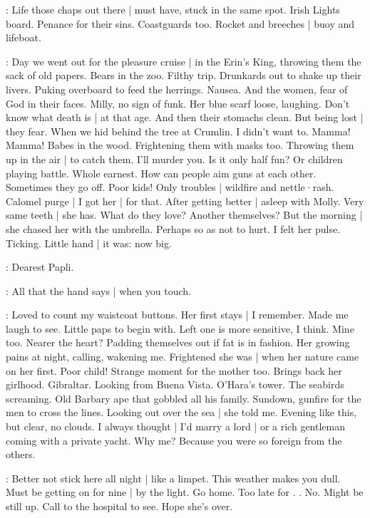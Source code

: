 \BloomAbstract:
Life those chaps out there |
must have,
stuck in the same spot.
Irish Lights board.
Penance for their sins.
Coastguards too.
Rocket and breeches |
buoy and lifeboat.

\BloomHist:
Day we went out for the pleasure cruise |
in the Erin's King,
throwing them the sack of old papers.
Bears in the zoo.
Filthy trip.
Drunkards out to shake up their livers.
Puking overboard to feed the herrings.
Nausea.
And the women,
fear of God in their faces.
Milly,
no sign of funk.
Her blue scarf loose,
laughing.
Don't know what death is |
at that age.
And then their stomachs clean.
But being lost |
they fear.
When we hid behind the tree at Crumlin.%
I didn't want to.
Mamma!
Mamma!
Babes in the wood.
Frightening them with masks too.
Throwing them up in the air |
to catch them.
I'll murder you.
Is it only half fun?
Or children playing battle.
Whole earnest.
How can people aim guns at each other.
Sometimes they go off.
Poor kids!
Only troubles |
wildfire and nettle·rash.
Calomel purge |
I got her |
for that.
After getting better |
asleep with Molly.
Very same teeth |
she has.
What do they love?
Another themselves?
But the morning |
she chased her with the umbrella.
Perhaps so as not to hurt.
I felt her pulse.
Ticking.
Little hand |
it was:
now big.

\BloomToday:
Dearest Papli.

\BloomAbstract:
All that the hand says |
when you touch.

\BloomHist:
Loved to count my waistcoat buttons.
Her first stays |
I remember.
Made me laugh to see.
Little paps to begin with.%
Left one is more sensitive,
I think.
Mine too.
Nearer the heart?
Padding themselves out
if fat is in fashion.
Her growing pains at night,
calling,
wakening me.
Frightened she was |
when her nature came on her first.
Poor child!
Strange moment for the mother too.
Brings back her girlhood.
Gibraltar.
Looking from Buena Vista.
O'Hara's tower.
The seabirds screaming.
Old Barbary ape that gobbled all his family.
Sundown,
gunfire for the men to cross the lines.
Looking out over the sea |
she told me.
Evening like this,
but clear,
no clouds.
I always thought |
I'd marry a lord |
or a rich gentleman coming with a private yacht.
Why me?
Because you were so foreign
from the others.

\BloomCurrent:
Better not stick here all night |
like a limpet.
This weather makes you dull.
Must be getting on for nine |
by the light.
Go home.
Too late for .
.
No.
Might be still up.
Call to the hospital to see.
Hope she's over.

